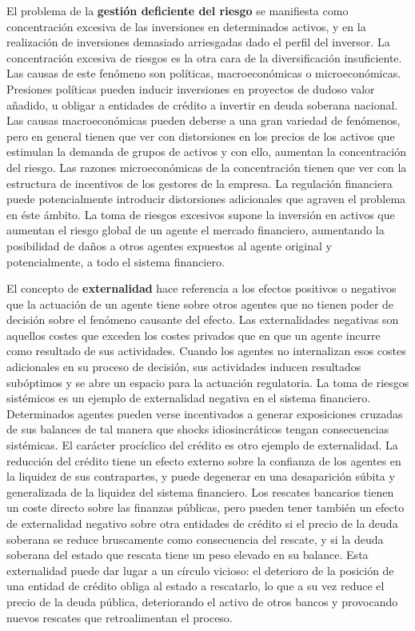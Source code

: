 \documentclass{nuevotema}
\begin{document}
El problema de la \textbf{gestión deficiente del riesgo} se manifiesta como concentración excesiva de las inversiones en determinados activos, y en la realización de inversiones demasiado arriesgadas dado el perfil del inversor. La concentración excesiva de riesgos es la otra cara de la diversificación insuficiente. Las causas de este fenómeno son políticas, macroeconómicas o microeconómicas. Presiones políticas pueden inducir inversiones en proyectos de dudoso valor añadido, u obligar a entidades de crédito a invertir en deuda soberana nacional. Las causas macroeconómicas pueden deberse a una gran variedad de fenómenos, pero en general tienen que ver con distorsiones en los precios de los activos que estimulan la demanda de grupos de activos y con ello, aumentan la concentración del riesgo. Las razones microeconómicas de la concentración tienen que ver con la estructura de incentivos de los gestores de la empresa. La regulación financiera puede potencialmente introducir distorsiones adicionales que agraven el problema en éste ámbito. La toma de riesgos excesivos supone la inversión en activos que aumentan el riesgo global de un agente el mercado financiero, aumentando la posibilidad de daños a otros agentes expuestos al agente original y potencialmente, a todo el sistema financiero.

El concepto de \textbf{externalidad} hace referencia a los efectos positivos o negativos que la actuación de un agente tiene sobre otros agentes que no tienen poder de decisión sobre el fenómeno causante del efecto. Las externalidades negativas son aquellos costes que exceden los costes privados que en que un agente incurre como resultado de sus actividades. Cuando los agentes no internalizan esos costes adicionales en su proceso de decisión, sus actividades inducen resultados subóptimos y se abre un espacio para la actuación regulatoria. La toma de riesgos sistémicos es un ejemplo de externalidad negativa en el sistema financiero. Determinados agentes pueden verse incentivados a generar exposiciones cruzadas de sus balances de tal manera que shocks idiosincráticos tengan consecuencias sistémicas. El carácter procíclico del crédito es otro ejemplo de externalidad. La reducción del crédito tiene un efecto externo sobre la confianza de los agentes en la liquidez de sus contrapartes, y puede degenerar en una desaparición súbita y generalizada de la liquidez del sistema financiero. Los rescates bancarios tienen un coste directo sobre las finanzas públicas, pero pueden tener también un efecto de externalidad negativo sobre otra entidades de crédito si el precio de la deuda soberana se reduce bruscamente como consecuencia del rescate, y si la deuda soberana del estado que rescata tiene un peso elevado en su balance. Esta externalidad puede dar lugar a un círculo vicioso: el deterioro de la posición de una entidad de crédito obliga al estado a rescatarlo, lo que a su vez reduce el precio de la deuda pública, deteriorando el activo de otros bancos y provocando nuevos rescates que retroalimentan el proceso. 
\end{document}
